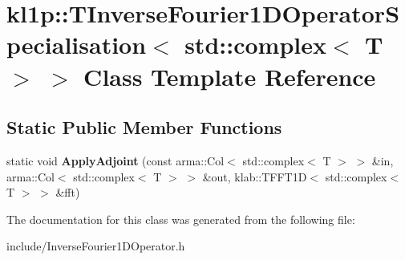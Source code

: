 \hypertarget{classkl1p_1_1TInverseFourier1DOperatorSpecialisation_3_01std_1_1complex_3_01T_01_4_01_4}{}\section{kl1p\+:\+:T\+Inverse\+Fourier1\+D\+Operator\+Specialisation$<$ std\+:\+:complex$<$ T $>$ $>$ Class Template Reference}
\label{classkl1p_1_1TInverseFourier1DOperatorSpecialisation_3_01std_1_1complex_3_01T_01_4_01_4}
\subsection*{Static Public Member Functions}
\begin{DoxyCompactItemize}
\item 
static void {\bfseries Apply\+Adjoint} (const arma\+::\+Col$<$ std\+::complex$<$ T $>$ $>$ \&in, arma\+::\+Col$<$ std\+::complex$<$ T $>$ $>$ \&out, klab\+::\+T\+F\+F\+T1D$<$ std\+::complex$<$ T $>$ $>$ \&fft)\hypertarget{classkl1p_1_1TInverseFourier1DOperatorSpecialisation_3_01std_1_1complex_3_01T_01_4_01_4_a7b996419815adcd6b676319e700e7018}{}\label{classkl1p_1_1TInverseFourier1DOperatorSpecialisation_3_01std_1_1complex_3_01T_01_4_01_4_a7b996419815adcd6b676319e700e7018}

\end{DoxyCompactItemize}


The documentation for this class was generated from the following file\+:\begin{DoxyCompactItemize}
\item 
include/Inverse\+Fourier1\+D\+Operator.\+h\end{DoxyCompactItemize}
